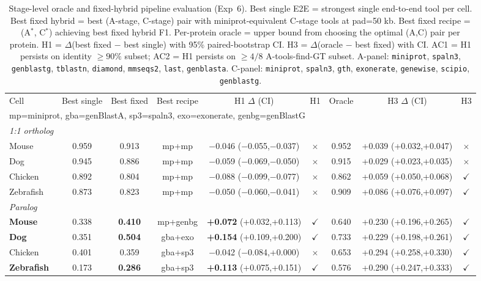 \begin{table}[t]
\centering
\caption{Stage-level oracle and fixed-hybrid pipeline evaluation (Exp~6). Best single E2E = strongest single end-to-end tool per cell. Best fixed hybrid = best (A-stage, C-stage) pair with miniprot-equivalent C-stage tools at pad=50 kb. Best fixed recipe = (A$^*$, C$^*$) achieving best fixed hybrid F1. Per-protein oracle = upper bound from choosing the optimal (A,C) pair per protein. H1 = $\Delta$(best fixed $-$ best single) with 95\% paired-bootstrap CI. H3 = $\Delta$(oracle $-$ best fixed) with CI. AC1 = H1 persists on identity $\ge 90\%$ subset; AC2 = H1 persists on $\ge 4/8$ A-tools-find-GT subset. A-panel: \texttt{miniprot}, \texttt{spaln3}, \texttt{genblastg}, \texttt{tblastn}, \texttt{diamond}, \texttt{mmseqs2}, \texttt{last}, \texttt{genblasta}. C-panel: \texttt{miniprot}, \texttt{spaln3}, \texttt{gth}, \texttt{exonerate}, \texttt{genewise}, \texttt{scipio}, \texttt{genblastg}.}
\label{tab:s_exp6_hybrid}
\footnotesize
\setlength{\tabcolsep}{2.5pt}
\begin{tabular}{lcccccccc}
\toprule
Cell & Best single & Best fixed & Best recipe & H1 $\Delta$ (CI) & H1 & Oracle & H3 $\Delta$ (CI) & H3 \\
\cmidrule{1-9}
\multicolumn{9}{l}{\footnotesize mp=miniprot, gba=genBlastA, sp3=spaln3, exo=exonerate, genbg=genBlastG} \\
\midrule
\textit{1:1 ortholog} \\
Mouse & 0.959 & 0.913 & mp+mp & $-$0.046 ($-$0.055,$-$0.037) & $\times$ & 0.952 & +0.039 (+0.032,+0.047) & $\times$ \\
Dog & 0.945 & 0.886 & mp+mp & $-$0.059 ($-$0.069,$-$0.050) & $\times$ & 0.915 & +0.029 (+0.023,+0.035) & $\times$ \\
Chicken & 0.892 & 0.804 & mp+mp & $-$0.088 ($-$0.099,$-$0.077) & $\times$ & 0.862 & +0.059 (+0.050,+0.068) & $\checkmark$ \\
Zebrafish & 0.873 & 0.823 & mp+mp & $-$0.050 ($-$0.060,$-$0.041) & $\times$ & 0.909 & +0.086 (+0.076,+0.097) & $\checkmark$ \\
\midrule
\textit{Paralog} \\
\textbf{Mouse} & 0.338 & \textbf{0.410} & mp+genbg & \textbf{+0.072} (+0.032,+0.113) & \textbf{$\checkmark$} & 0.640 & +0.230 (+0.196,+0.265) & $\checkmark$ \\
\textbf{Dog} & 0.351 & \textbf{0.504} & gba+exo & \textbf{+0.154} (+0.109,+0.200) & \textbf{$\checkmark$} & 0.733 & +0.229 (+0.198,+0.261) & $\checkmark$ \\
Chicken & 0.401 & 0.359 & gba+sp3 & $-$0.042 ($-$0.084,+0.000) & $\times$ & 0.653 & +0.294 (+0.258,+0.330) & $\checkmark$ \\
\textbf{Zebrafish} & 0.173 & \textbf{0.286} & gba+sp3 & \textbf{+0.113} (+0.075,+0.151) & \textbf{$\checkmark$} & 0.576 & +0.290 (+0.247,+0.333) & $\checkmark$ \\
\bottomrule
\end{tabular}


\end{table}
